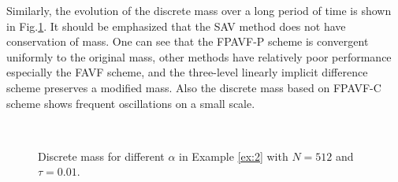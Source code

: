 \documentclass[preprint,compress,3p,10pt,fleqn]{elsarticle}
\numberwithin{equation}{section}
\begin{document}
Similarly, the evolution of the discrete mass over a long period of time is shown in Fig.\ref{fig:4}. It should be emphasized that the SAV method does not have conservation of mass.
One can see that the FPAVF-P scheme is convergent uniformly to the original mass, other methods have relatively poor performance especially the FAVF scheme, and the three-level linearly implicit difference scheme preserves a modified mass. Also the discrete mass based on FPAVF-C scheme shows frequent oscillations on a small scale.

\begin{figure}[H]
	\begin{center}
	 \\
	 \caption{Discrete mass for different $\alpha$ in Example \ref{ex:2} with $N = 512$ and $\tau=0.01$.} \label{fig:4}
	\end{center}
	\end{figure}
\end{document}
